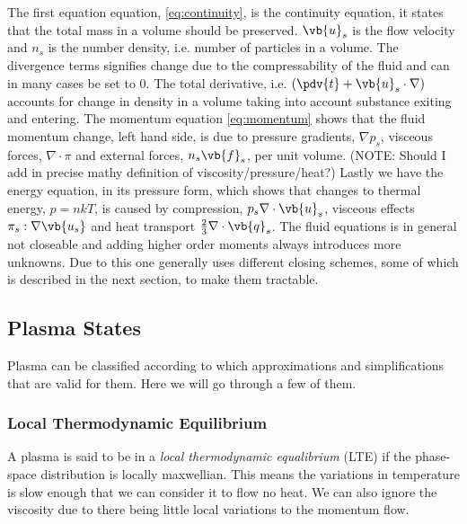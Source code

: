 
	The first equation equation, \cref{eq:continuity}, is the continuity equation, it states that the total mass
	in a volume	should be preserved. \(\vb{u}_s\) is the flow velocity and \(n_s\) is the number density, i.e.
	number of particles in a volume. The divergence terms signifies change due to the compressability of the fluid
	and can in many cases be set to \(0\). The total derivative, i.e. \(\left(\pdv{t} + \vb{u}_s\cdot\nabla \right)\) accounts for
	change in density in a volume taking into account substance exiting and entering.
	The momentum equation \cref{eq:momentum} shows that the fluid momentum change, left hand side,
	is due to pressure gradients, \(\nabla p_s\), visceous forces, \(\nabla \cdot \pi \) and external forces, \(n_s\vb{f}_s\),
	per unit volume. (NOTE: Should I add in precise mathy definition of viscosity/pressure/heat?)
	Lastly we have the energy equation, in its pressure form, which shows that changes to thermal
	energy, \(p = nkT\), is caused by compression, \(p_s\nabla \cdot \vb{u}_s\), visceous effects \(\pi_s : \nabla{\vb{u_s}}\)
	and heat transport	\(\frac{2}{3}\nabla \cdot \vb{q}_s\).
	The fluid equations is in general not closeable and adding higher order moments
	always introduces more unknowns. Due to this one generally uses different closing
	schemes, some of which is described in the next section, to make them tractable.

\subsection{Plasma States}
	Plasma can be classified according to which	approximations and simplifications
	that are valid for them. Here we will go through a few of them.

	\subsubsection{Local Thermodynamic Equilibrium}
	A plasma is said to be in a \textit{local thermodynamic equalibrium} (LTE)
	if the phase-space distribution is locally maxwellian. This means the variations
	in temperature is slow enough that we can consider it to flow no heat. We can also ignore
	the viscosity due to there being little local variations to the momentum flow.

